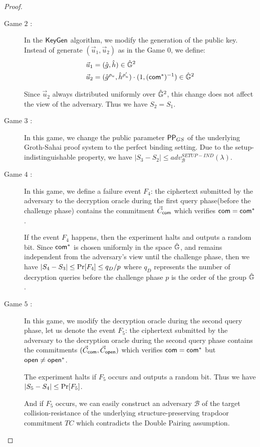 \begin{proof}
\begin{description}
  \item[\textsf{Game} $2$ :] In the ${\mathsf{KeyGen}}$ algorithm, we modify the generation of the public key. Instead of generate $(\vec{u}_1, \vec{u}_2)$ as in the \textsf{Game} 0, we define:
    \begin{align*}
      \vec{u}_1 &= (\hat{g}, \hat{h}) \in \hat{\mathbb{G}}^2\\
      \vec{u}_2 &= (\hat{g}^{\rho_u}, \hat{h}^{\rho_u'}) \cdot (1, (\mathsf{com}^*)^{-1}) \in \hat{\mathbb{G}}^2
    \end{align*}

    Since $\vec{u}_2$ always distributed uniformly over $\hat{\mathbb{G}}^2$, this change does not affect the view of the adversary. Thus we have $S_2 = S_1$.

  \item[\textsf{Game} $3$ :] In this game, we change the public parameter $\mathsf{PP}_{GS}$ of the underlying Groth-Sahai proof system to the perfect binding setting. Due to the setup-indistinguishable property, we have $|S_3 - S_2| \leq adv_{\mathcal{B}}^{SETUP-IND}(\lambda)$.

  \item[\textsf{Game} $4$ :] In this game, we define a failure event $F_4$: the ciphertext submitted by the adversary to the decryption oracle during the first query phase(before the challenge phase) contains the commitment $\vec{C}_{\mathsf{com}}$ which verifies $\mathsf{com} = \mathsf{com}^*$.

    If the event $F_4$ happens, then the experiment halts and outputs a random bit. Since $\mathsf{com}^*$ is chosen uniformly in the space $\hat{\mathbb{G}}$, and remains independent from the adversary's view until the challenge phase, then we have $|S_4 - S_3| \leq \operatorname{Pr}[F_4] \leq q_D/p$ where $q_D$ represents the number of decryption queries before the challenge phase $p$ is the order of the group $\hat{\mathbb{G}}$.

  \item[\textsf{Game} $5$ :] In this game, we modify the decryption oracle during the second query phase, let us denote the event $F_5$: the ciphertext submitted by the adversary to the decryption oracle during the second query phase contains the commitments $(\vec{C}_{\mathsf{com}}, \vec{C}_{\mathsf{open}})$ which verifies $\mathsf{com} = \mathsf{com}^*$ but $\mathsf{open} \neq \mathsf{open}^*$.

    The experiment halts if $F_5$ occurs and outputs a random bit. Thus we have $|S_5- S_4| \leq \operatorname{Pr}[F_5]$.

    And if $F_5$ occurs, we can easily construct an adversary $\mathcal{B}$ of the target collision-resistance of the underlying structure-preserving trapdoor commitment $TC$ which contradicts the Double Pairing assumption.


\end{description}
\end{proof}

